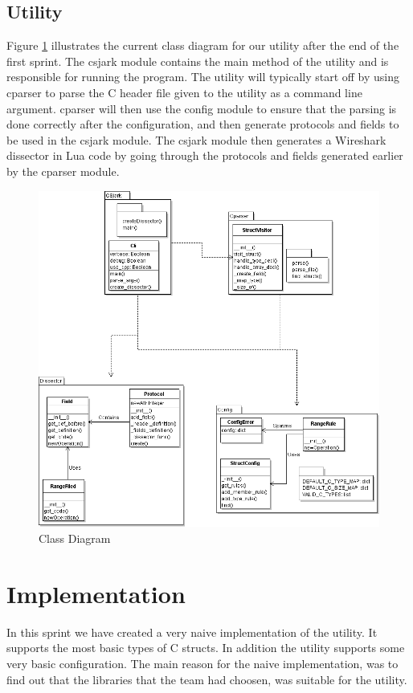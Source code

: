 \subsection{Utility}
Figure \ref{fig:sp1_class} illustrates the current class diagram for our
utility after the end of the first sprint. The csjark module contains the main
method of the utility and is responsible for running the program. The utility
will typically start off by using cparser to parse the C header file given to
the utility as a command line argument. cparser will then use the config module
to ensure that the parsing is done correctly after the configuration, and then
generate protocols and fields to be used in the csjark module. The csjark
module then generates a Wireshark dissector in Lua code by going through the
protocols and fields generated earlier by the cparser module.

\begin{figure}[!htb]
	\center
	\includegraphics[width=\textwidth]{./sprints/img/class_diagram_s1}
	\caption{Class Diagram\label{fig:sp1_class}}
\end{figure}


\section{Implementation}
\label{sec:sp1:impl}
In this sprint we have created a very naive implementation of the utility. It
supports the most basic types of C structs. In addition the utility supports
some very basic configuration. The main reason for the naive implementation, 
was to find out that the libraries that the team had choosen, was suitable for 
the utility.

